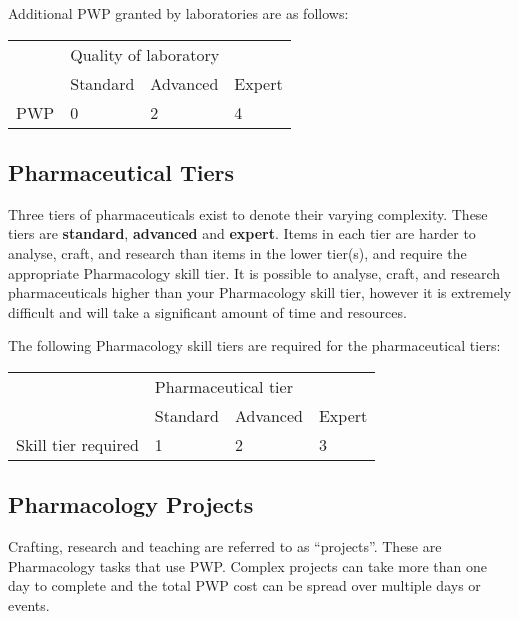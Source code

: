 Additional PWP granted by laboratories are as follows:

\begin{table}
\begin{tabular}{|l|l|l|l|} \hline 
\multirow{1}{*}{}& \multicolumn{3}{|l|}{Quality of laboratory} \\
\cline{2-2}\cline{3-3}\cline{4-4} & Standard & Advanced & Expert \\
 \hline PWP & 0 & 2 & 4 \\
 \hline \end{tabular}

\end{table}

\subsection{Pharmaceutical Tiers}

Three tiers of pharmaceuticals exist to denote their varying complexity. These tiers are \textbf{standard}, \textbf{advanced} and \textbf{expert}. Items in each tier are harder to analyse, craft, and research than items in the lower tier(s), and require the appropriate Pharmacology skill tier. It is possible to analyse, craft, and research pharmaceuticals higher than your Pharmacology skill tier, however it is extremely difficult and will take a significant amount of time and resources.

The following Pharmacology skill tiers are required for the pharmaceutical tiers:

\begin{table}
\begin{tabular}{|l|l|l|l|} \hline 
\multirow{1}{*}{}& \multicolumn{3}{|l|}{Pharmaceutical tier} \\
\cline{2-2}\cline{3-3}\cline{4-4} & Standard & Advanced & Expert \\
 \hline Skill tier required & 1 & 2 & 3 \\
 \hline \end{tabular}

\end{table}

\subsection{Pharmacology Projects}

Crafting, research and teaching are referred to as ``projects''. These are Pharmacology tasks that use PWP. Complex projects can take more than one day to complete and the total PWP cost can be spread over multiple days or events.

